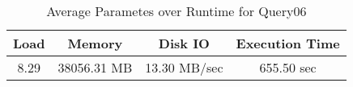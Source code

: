 \documentclass[../../main.tex]{subfiles}
\begin{document}
    \begin{table}
        \begin{center}
            \begin{tabular}{ |c|c|c|c| } 
            \hline
            Load & Memory & Disk IO & Execution Time\\
            \hline
            8.29 & 38056.31 MB & 13.30 MB/sec & 655.50 sec \\
            \hline
            \end{tabular}
            \\[1pt]
            \caption{Average Parametes over Runtime for Query06}
        \end{center}
    \end{table}
    \pagebreak
\end{document}

